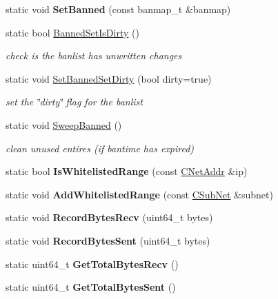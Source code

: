 \begin{DoxyCompactItemize}
static void {\bfseries Set\+Banned} (const banmap\+\_\+t \&banmap)
\item 
\mbox{\label{class_c_node_a238cd722064013a8dff38b02d2da4869}} 
static bool \mbox{\hyperlink{class_c_node_a238cd722064013a8dff38b02d2da4869}{Banned\+Set\+Is\+Dirty}} ()
\begin{DoxyCompactList}\small\item\em check is the banlist has unwritten changes \end{DoxyCompactList}\item 
\mbox{\label{class_c_node_ab4248e8207bfae98f83ce56a4b25d07b}} 
static void \mbox{\hyperlink{class_c_node_ab4248e8207bfae98f83ce56a4b25d07b}{Set\+Banned\+Set\+Dirty}} (bool dirty=true)
\begin{DoxyCompactList}\small\item\em set the \char`\"{}dirty\char`\"{} flag for the banlist \end{DoxyCompactList}\item 
\mbox{\label{class_c_node_ad8b42ef7c930421014b59e845ec5295b}} 
static void \mbox{\hyperlink{class_c_node_ad8b42ef7c930421014b59e845ec5295b}{Sweep\+Banned}} ()
\begin{DoxyCompactList}\small\item\em clean unused entires (if bantime has expired) \end{DoxyCompactList}\item 
\mbox{\label{class_c_node_ad2ccd5d22994f338c9b55ebe7528ea55}} 
static bool {\bfseries Is\+Whitelisted\+Range} (const \mbox{\hyperlink{class_c_net_addr}{C\+Net\+Addr}} \&ip)
\item 
\mbox{\label{class_c_node_ad2c1f955ec23851bd87a6bb144d85d03}} 
static void {\bfseries Add\+Whitelisted\+Range} (const \mbox{\hyperlink{class_c_sub_net}{C\+Sub\+Net}} \&subnet)
\item 
\mbox{\label{class_c_node_af72b4b6e454c743af071896019ae1c69}} 
static void {\bfseries Record\+Bytes\+Recv} (uint64\+\_\+t bytes)
\item 
\mbox{\label{class_c_node_a945c993a84eaa9d6bca18284befaccbe}} 
static void {\bfseries Record\+Bytes\+Sent} (uint64\+\_\+t bytes)
\item 
\mbox{\label{class_c_node_a1988b63b48fdc9b72014bdf9588b0168}} 
static uint64\+\_\+t {\bfseries Get\+Total\+Bytes\+Recv} ()
\item 
\mbox{\label{class_c_node_af318a64e7ddad50d1e1b6fc123a5f0b9}} 
static uint64\+\_\+t {\bfseries Get\+Total\+Bytes\+Sent} ()
\end{DoxyCompactItemize}
